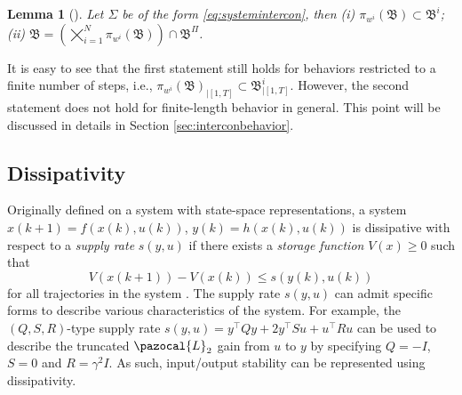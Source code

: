 \documentclass[11pt,print,draftcls,onecolumn,romanappendices]{ieeecolor}
\newtheorem{lem}[thm]{Lemma}
\newcommand{\proj}[2]{\pi_{#1}\left(#2\right)}
\newcommand{\revise}[1]{{\color{black} #1}}
\newcommand{\B}{\mathfrak{B}}
\newcommand{\bint}[1]{{|[#1]}}
\begin{document}
\begin{lem}[\cite{Yan:2021}]\label{lem:interconbehaviourproj}
	Let $\Sigma$ be of the form \eqref{eq:systemintercon}, then (i) $ \proj{w^i}{\B}\subset\B^i$; (ii) $ \B=\left(\bigtimes_{i=1}^{N}\proj{w^i}{\B}\right)\cap\B^\Pi$.
\end{lem}
It is easy to see that the first statement still holds for behaviors restricted to a finite number of steps, i.e., $\proj{w^i}{\B}_\bint{1,T}\subset\B^i_\bint{1,T}$. However, the second statement does not hold for finite-length behavior in general. This point will be discussed in details in Section \ref{sec:interconbehavior}. 
\subsection{Dissipativity}
\revise{Originally defined on a system with state-space representations, a system $x(k+1)=f(x(k),u(k))$, $y(k)=h(x(k),u(k))$ is dissipative with respect to a \emph{supply rate} $s(y,u)$ if there exists a \emph{storage function} $V(x)\geq0$ such that 
	\begin{equation}\label{eq:dissconventional}
		V(x(k+1))-V(x(k))\leq s(y(k),u(k))
	\end{equation}
for all trajectories in the system \cite{Willems:1972}.} The supply rate $s(y,u)$ can admit specific forms to describe various characteristics of the system. For example, the $(Q,S,R)$-type supply rate $s(y,u)=y^\top Qy+2y^\top Su+u^\top Ru$ can be used to describe the truncated $\pazocal{L}_2$ gain from $u$ to $y$ by specifying $Q=-I$, $S=0$ and $R=\gamma^2 I$. As such, input/output stability can be represented using dissipativity.
	
\end{document}
